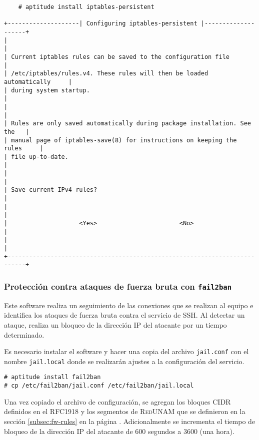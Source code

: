 {
\scriptsize
\linespread{1}
\begin{verbatim}
    # aptitude install iptables-persistent

+--------------------| Configuring iptables-persistent |--------------------+
|                                                                           |
| Current iptables rules can be saved to the configuration file             |
| /etc/iptables/rules.v4. These rules will then be loaded automatically     |
| during system startup.                                                    |
|                                                                           |
| Rules are only saved automatically during package installation. See the   |
| manual page of iptables-save(8) for instructions on keeping the rules     |
| file up-to-date.                                                          |
|                                                                           |
| Save current IPv4 rules?                                                  |
|                                                                           |
|                    <Yes>                       <No>                       |
|                                                                           |
+---------------------------------------------------------------------------+
\end{verbatim}
}

        \subsubsection {Protecci\'{o}n contra ataques de fuerza bruta con \texttt{fail2ban}}

Este software realiza un seguimiento de las conexiones que se realizan al equipo e identifica los ataques de fuerza bruta contra el servicio de \textsc{SSH}. Al detectar un ataque, realiza un bloqueo de la direcci\'{o}n \textsc{IP} del atacante por un tiempo determinado.

Es necesario instalar el software y hacer una copia del archivo \texttt{jail.conf} con el nombre \texttt{jail.local} donde se realizar\'{a}n ajustes a la configuraci\'{o}n del servicio.

{
\scriptsize
\linespread{1}
\begin{verbatim}
# aptitude install fail2ban
# cp /etc/fail2ban/jail.conf /etc/fail2ban/jail.local
\end{verbatim}
}

Una vez copiado el archivo de configuraci\'{o}n, se agregan los bloques \textsc{CIDR} definidos en el \textsc{RFC1918} y los segmentos de \textsc{RedUNAM} que se definieron en la secci\'{o}n \ref{subsec:fw-rules} en la p\'{a}gina \pageref{subsec:fw-rules}. Adicionalmente se incrementa el tiempo de bloqueo de la direcci\'{o}n IP del atacante de 600 segundos a 3600 (una hora).


